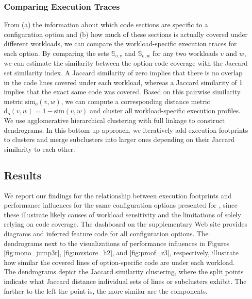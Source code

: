 {{{\subsubsection{Comparing Execution Traces}
From (a) the information about which code sections are specific to a configuration option and (b) how much of these sections is actually covered under different workloads, we can compare the workload-specific execution traces for each option. By comparing the sets $\mathbb{S}_{o, v}$ and $\mathbb{S}_{o, w}$ for any two workloads $v$ and $w$, we can estimate the similarity between the option-code coverage with the Jaccard set similarity index. A Jaccard similarity of zero implies that there is no overlap in the code lines covered under each workload, whereas a Jaccard similarity of 1 implies that the exact same code was covered. Based on this pairwise similarity metric $\text{sim}_o(v, w)$, we can compute a corresponding distance metric $\text{d}_o(v, w) = 1 - \text{sim}(v, w)$ and cluster all workload-specific execution profiles. 
We use agglomerative hierarchical clustering with full linkage to construct dendrograms. In this bottom-up approach, we iteratively add execution footprints to clusters and merge subclusters into larger ones depending on their Jaccard similarity  to each other. 

\subsection{Results}\label{sec:results3}
We report our findings for the relationship between execution footprints and performance influences for the same configuration options presented for , since these illustrate likely causes of workload sensitivity and the limitations of solely relying on code coverage. The dashboard on the supplementary Web site provides diagrams and inferred feature code for all configuration options. The dendrograms next to the visualizations of performance influences in Figures \ref{fig:mono_jump3r}, \ref{fig:mvstore_h2}, and \ref{fig:proof_z3}, respectively, illustrate how similar the covered lines of option-specific code are under each workload. 
The dendrograms depict the Jaccard similarity clustering, where the split points indicate what Jaccard distance individual sets of lines or subclusters exhibit. The farther to the left the point is, the more similar are the components.

}}}
